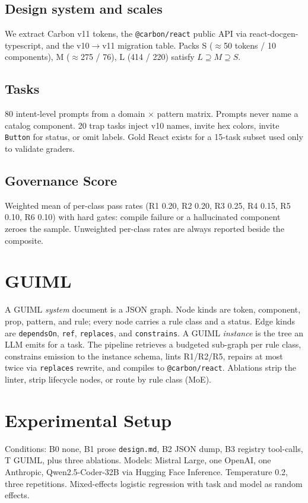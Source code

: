 \documentclass[journal]{IEEEtran}
\begin{document}
\subsection{Design system and scales}
We extract Carbon v11 tokens, the \texttt{@carbon/react} public API via react-docgen-typescript, and the v10$\to$v11 migration table. Packs S ($\approx$50 tokens / 10 components), M ($\approx$275 / 76), L (414 / 220) satisfy $L \supseteq M \supseteq S$.

\subsection{Tasks}
80 intent-level prompts from a domain $\times$ pattern matrix. Prompts never name a catalog component. 20 trap tasks inject v10 names, invite hex colors, invite \texttt{Button} for status, or omit labels. Gold React exists for a 15-task subset used only to validate graders.

\subsection{Governance Score}
Weighted mean of per-class pass rates (R1 0.20, R2 0.20, R3 0.25, R4 0.15, R5 0.10, R6 0.10) with hard gates: compile failure or a hallucinated component zeroes the sample. Unweighted per-class rates are always reported beside the composite.

\section{GUIML}
A GUIML \emph{system} document is a JSON graph. Node kinds are token, component, prop, pattern, and rule; every node carries a rule class and a status. Edge kinds are \texttt{dependsOn}, \texttt{ref}, \texttt{replaces}, and \texttt{constrains}. A GUIML \emph{instance} is the tree an LLM emits for a task. The pipeline retrieves a budgeted sub-graph per rule class, constrains emission to the instance schema, lints R1/R2/R5, repairs at most twice via \texttt{replaces} rewrite, and compiles to \texttt{@carbon/react}. Ablations strip the linter, strip lifecycle nodes, or route by rule class (MoE).

\section{Experimental Setup}
Conditions: B0 none, B1 prose \texttt{design.md}, B2 JSON dump, B3 registry tool-calls, T GUIML, plus three ablations. Models: Mistral Large, one OpenAI, one Anthropic, Qwen2.5-Coder-32B via Hugging Face Inference. Temperature 0.2, three repetitions. Mixed-effects logistic regression with task and model as random effects.
\end{document}
